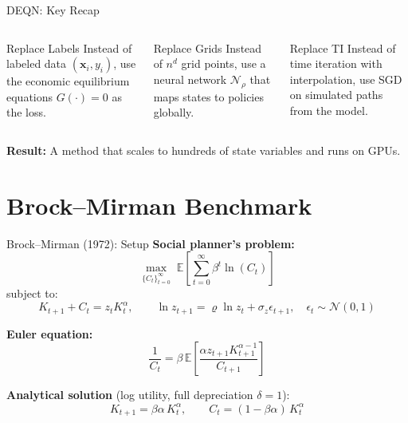 \documentclass[aspectratio=169,11pt]{beamer}
\newcommand{\emphc}[1]{\textcolor{harvardcrimson}{#1}}
\newcommand{\x}{\bm{x}}
\newcommand{\E}[1]{\mathbb{E}\!\left[#1\right]}
\begin{document}
\begin{frame}{DEQN: Key Recap}
\begin{columns}[T]
\begin{block}{Replace Labels}
\centering
\small
Instead of labeled data $(\x_i, y_i)$, use the economic equilibrium equations $G(\cdot) = 0$ as the loss.
\end{block}

\begin{block}{Replace Grids}
\centering
\small
Instead of $n^d$ grid points, use a neural network $\mathcal{N}_\rho$ that maps states to policies \emphc{globally}.
\end{block}

\begin{block}{Replace TI}
\centering
\small
Instead of time iteration with interpolation, use SGD on simulated paths from the model.
\end{block}
\end{columns}

\vspace{0.8em}
\begin{center}
\textbf{Result:} A method that scales to \emphc{hundreds of state variables} and runs on GPUs.
\end{center}
\end{frame}



\section{Brock--Mirman Benchmark}

\begin{frame}{Brock--Mirman (1972): Setup}
\textbf{Social planner's problem:}
\[
\max_{\{C_t\}_{t=0}^{\infty}} \; \E{\sum_{t=0}^{\infty} \beta^t \ln(C_t)}
\]
subject to:
\[
K_{t+1} + C_t = z_t K_t^\alpha, \qquad \ln z_{t+1} = \varrho \ln z_t + \sigma_z \epsilon_{t+1}, \quad \epsilon_t \sim \mathcal{N}(0,1)
\]

\vspace{0.3em}
\textbf{Euler equation:}
\[
\frac{1}{C_t} = \beta \, \E{\frac{\alpha z_{t+1} K_{t+1}^{\alpha-1}}{C_{t+1}}}
\]

\vspace{0.3em}
\textbf{Analytical solution} (log utility, full depreciation $\delta = 1$):
\[
K_{t+1} = \beta \alpha \, K_t^\alpha, \qquad C_t = (1 - \beta\alpha) \, K_t^\alpha
\]
\end{frame}
\end{document}
